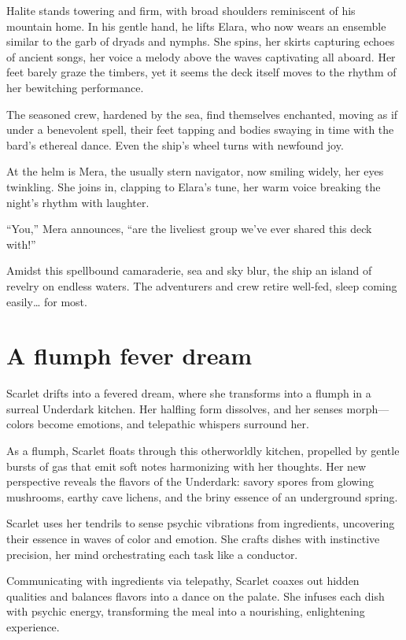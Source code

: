 \documentclass[
  letterpaper,12pt,twoside,twocolumn,openany,
  nodeprecatedcode,bg=full]{dndbook}
\begin{document}
Halite stands towering and firm, with broad shoulders reminiscent of his
mountain home. In his gentle hand, he lifts Elara, who now wears an
ensemble similar to the garb of dryads and nymphs. She spins, her skirts
capturing echoes of ancient songs, her voice a melody above the waves
captivating all aboard. Her feet barely graze the timbers, yet it seems
the deck itself moves to the rhythm of her bewitching performance.

The seasoned crew, hardened by the sea, find themselves enchanted,
moving as if under a benevolent spell, their feet tapping and bodies
swaying in time with the bard's ethereal dance. Even the ship's wheel
turns with newfound joy.

At the helm is Mera, the usually stern navigator, now smiling widely,
her eyes twinkling. She joins in, clapping to Elara's tune, her warm
voice breaking the night's rhythm with laughter.

``You,'' Mera announces, ``are the liveliest group we've ever shared
this deck with!''

Amidst this spellbound camaraderie, sea and sky blur, the ship an island
of revelry on endless waters. The adventurers and crew retire well-fed,
sleep coming easily\ldots{} for most.

\section{A flumph fever dream}\label{a-flumph-fever-dream}

Scarlet drifts into a fevered dream, where she transforms into a flumph
in a surreal Underdark kitchen. Her halfling form dissolves, and her
senses morph--- colors become emotions, and telepathic whispers surround
her.

As a flumph, Scarlet floats through this otherworldly kitchen, propelled
by gentle bursts of gas that emit soft notes harmonizing with her
thoughts. Her new perspective reveals the flavors of the Underdark:
savory spores from glowing mushrooms, earthy cave lichens, and the briny
essence of an underground spring.

Scarlet uses her tendrils to sense psychic vibrations from ingredients,
uncovering their essence in waves of color and emotion. She crafts
dishes with instinctive precision, her mind orchestrating each task like
a conductor.

Communicating with ingredients via telepathy, Scarlet coaxes out hidden
qualities and balances flavors into a dance on the palate. She infuses
each dish with psychic energy, transforming the meal into a nourishing,
enlightening experience.
\end{document}
